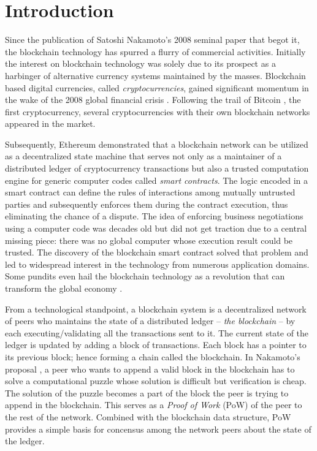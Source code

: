\section{Introduction}
Since the publication of Satoshi Nakamoto's 2008 seminal paper \cite{bitcoin} that begot it, the blockchain technology has spurred a flurry of commercial activities. Initially the interest on blockchain technology was solely due to its prospect as a harbinger of alternative currency systems maintained by the masses. Blockchain based digital currencies, called \textit{cryptocurrencies}, gained significant momentum in the wake of the 2008 global financial crisis \cite{fincrisis}. Following the trail of Bitcoin \cite{bitcoin}, the first cryptocurrency, several cryptocurrencies \cite{bitcoinCash} \cite{David:2018:DCW:3208446} \cite{Takashima:2018:LUG:3235215} \cite{dogecoin} \cite{neo} with their own blockchain networks appeared in the market.
 
Subsequently, Ethereum \cite{Wood2014EthereumAS} demonstrated that a blockchain network can be utilized as a decentralized state machine that serves not only as a maintainer of a distributed ledger of cryptocurrency transactions but also a trusted computation engine for generic computer codes called \textit{smart contracts}. The logic encoded in a smart contract can define the rules of interactions among mutually untrusted parties and subsequently enforces them during the contract execution, thus eliminating the chance of a dispute. The idea of enforcing business negotiations using a computer code was decades old \cite{FM548} but did not get traction due to a central missing piece: there was no global computer whose execution result could be trusted. The discovery of the blockchain smart contract solved that problem and led to widespread interest in the technology from numerous application domains. Some pundits even hail the blockchain technology as a revolution that can transform the global economy \cite{blockchainRevolution1} \cite{blockchainRevolution2}.

From a technological standpoint, a blockchain system is a decentralized network of peers who maintains the state of a distributed ledger -- \textit{the blockchain} -- by each executing/validating all the transactions sent to it. The current state of the ledger is updated by adding a block of transactions. Each block has a pointer to its previous block; hence forming a chain called the blockchain. In Nakamoto's proposal \cite{bitcoin}, a peer who wants to append a valid block in the blockchain has to solve a computational puzzle whose solution is difficult but verification is cheap. The solution of the puzzle becomes a part of the block the peer is trying to append in the blockchain. This serves as a \textit{Proof of Work} (PoW) \cite{Back02hashcash} of the peer to the rest of the network. Combined with the blockchain data structure, PoW provides a simple basis for concensus \cite{Barborak:1993:CPF:152610.152612} among the network peers about the state of the ledger.

